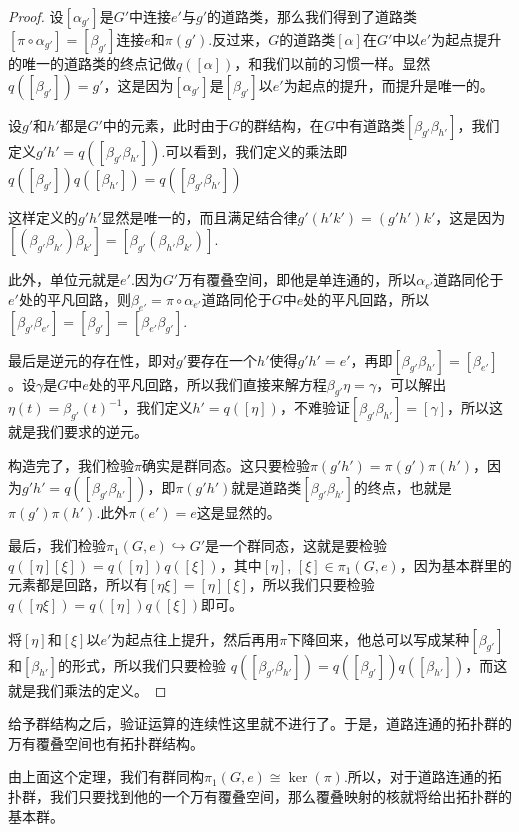 \begin{proof}
设$[\alpha_{g'}]$是$G'$中连接$e'$与$g'$的道路类，那么我们得到了道路类$[\pi\circ \alpha_{g'}]=[\beta_{g'}]$连接$e$和$\pi(g')$.反过来，$G$的道路类$[\alpha]$在$G'$中以$e'$为起点提升的唯一的道路类的终点记做$q([\alpha])$，和我们以前的习惯一样。显然$q([\beta_{g'}])=g'$，这是因为$[\alpha_{g'}]$是$[\beta_{g'}]$以$e'$为起点的提升，而提升是唯一的。

设$g'$和$h'$都是$G'$中的元素，此时由于$G$的群结构，在$G$中有道路类$[\beta_{g'}\beta_{h'}]$，我们定义$g'h'=q([\beta_{g'}\beta_{h'}])$.可以看到，我们定义的乘法即$q([\beta_{g'}])q([\beta_{h'}])=q([\beta_{g'}\beta_{h'}])$

这样定义的$g'h'$显然是唯一的，而且满足结合律$g'(h'k')=(g'h')k'$，这是因为$[(\beta_{g'}\beta_{h'})\beta_{k'}]=[\beta_{g'}(\beta_{h'}\beta_{k'})]$.

此外，单位元就是$e'$.因为$G'$万有覆叠空间，即他是单连通的，所以$\alpha_{e'}$道路同伦于$e'$处的平凡回路，则$\beta_{e'}=\pi\circ \alpha_{e'}$道路同伦于$G$中$e$处的平凡回路，所以$[\beta_{g'}\beta_{e'}]=[\beta_{g'}]=[\beta_{e'}\beta_{g'}]$.

最后是逆元的存在性，即对$g'$要存在一个$h'$使得$g'h'=e'$，再即$[\beta_{g'}\beta_{h'}]=[\beta_{e'}]$。设$\gamma$是$G$中$e$处的平凡回路，所以我们直接来解方程$\beta_{g'}\eta=\gamma$，可以解出$\eta(t)=\beta_{g'}(t)^{-1}$，我们定义$h'=q([\eta])$，不难验证$[\beta_{g'}\beta_{h'}]=[\gamma]$，所以这就是我们要求的逆元。

构造完了，我们检验$\pi$确实是群同态。这只要检验$\pi(g'h')=\pi(g')\pi(h')$，因为$g'h'=q([\beta_{g'}\beta_{h'}])$，即$\pi(g'h')$就是道路类$[\beta_{g'}\beta_{h'}]$的终点，也就是$\pi(g')\pi(h')$.此外$\pi(e')=e$这是显然的。

最后，我们检验$\pi_1(G,e)\hookrightarrow G'$是一个群同态，这就是要检验$q([\eta][\xi])=q([\eta])q([\xi])$，其中$[\eta]$, $[\xi]\in \pi_1(G,e)$，因为基本群里的元素都是回路，所以有$[\eta\xi]=[\eta][\xi]$，所以我们只要检验$q([\eta\xi])=q([\eta])q([\xi])$即可。

将$[\eta]$和$[\xi]$以$e'$为起点往上提升，然后再用$\pi$下降回来，他总可以写成某种$[\beta_{g'}]$和$[\beta_{h'}]$的形式，所以我们只要检验
$q([\beta_{g'}\beta_{h'}])=q([\beta_{g'}])q([\beta_{h'}])$，而这就是我们乘法的定义。
\end{proof}

\para 给予群结构之后，验证运算的连续性这里就不进行了。于是，道路连通的拓扑群的万有覆叠空间也有拓扑群结构。

\para 由上面这个定理，我们有群同构$\pi_1(G,e)\cong \ker(\pi)$.所以，对于道路连通的拓扑群，我们只要找到他的一个万有覆叠空间，那么覆叠映射的核就将给出拓扑群的基本群。


